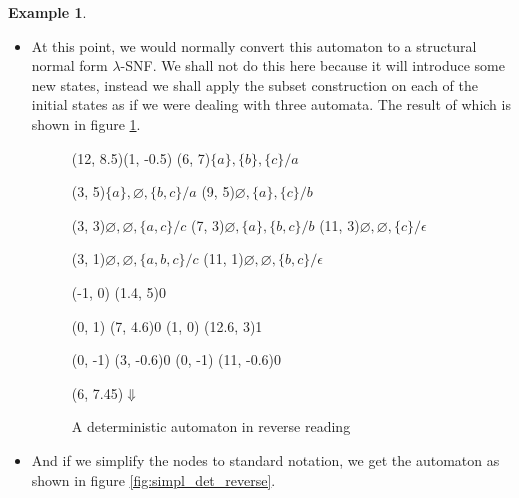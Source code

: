 \documentclass{article}
\theoremstyle{definition}
\newtheorem{example}[theorem]{Example}
\begin{document}
\begin{example}
\begin{itemize}
\item At this point, we would normally convert this automaton to a structural 
      normal form $\lambda$-SNF. We shall not do this here because it will 
      introduce some new states, instead we shall apply the subset construction
      on each of the initial states as if we were dealing with three automata. 
      The result of which is shown in figure \ref{fig:det_reverse}.

\begin{figure}[p]
\begin{graph}(12, 8.5)(1, -0.5)
  (6, 7){$\{a\}, \{b\}, \{c\} / a$}

  (3, 5){$\{a\}, \varnothing, \{b, c\} / a$}
  (9, 5){$\varnothing, \{a\}, \{c\} / b$}

  (3, 3){$\varnothing, \varnothing, \{a, c\} / c$}
  (7, 3){$\varnothing, \{a\}, \{b, c\} / b$}
  (11, 3){$\varnothing, \varnothing, \{c\} / \epsilon$}

  (3, 1){$\varnothing, \varnothing, \{a, b, c\} / c$}
  (11, 1){$\varnothing, \varnothing, \{b, c\} / \epsilon$}

   
   

  (-1, 0) \freetext(1.4, 5){0}
   
   
   

   
   
  (0, 1) \freetext(7, 4.6){0}
   
   
  (1, 0) \freetext(12.6, 3){1}
  
  (0, -1) \freetext(3, -0.6){0}
   
  (0, -1) \freetext(11, -0.6){0}
   

  \freetext(6, 7.45){$\Downarrow$}
\end{graph}
\caption{A deterministic automaton in reverse reading}
\label{fig:det_reverse}
\end{figure}

\item And if we simplify the nodes to standard notation, we get the automaton 
      as shown in figure \ref{fig:simpl_det_reverse}.


\end{itemize}
\end{example}
\end{document}

